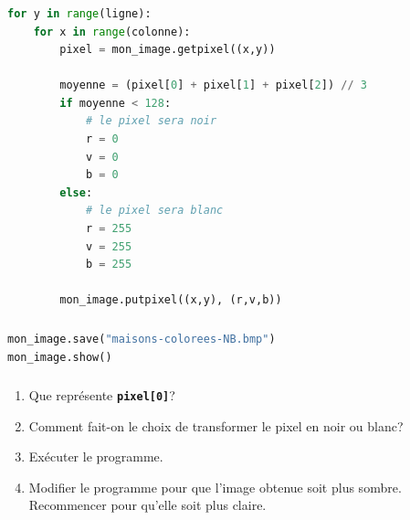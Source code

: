 \documentclass[svgnames,11pt]{beamer}
\begin{document}
\begin{frame}[fragile]
    \frametitle{}

    \begin{center}
        \begin{lstlisting}[language=Python , basicstyle=\ttfamily\small, xleftmargin=1em, xrightmargin=1em]
for y in range(ligne):
    for x in range(colonne):
        pixel = mon_image.getpixel((x,y))

        moyenne = (pixel[0] + pixel[1] + pixel[2]) // 3
        if moyenne < 128:
            # le pixel sera noir
            r = 0
            v = 0
            b = 0
        else:
            # le pixel sera blanc
            r = 255
            v = 255
            b = 255

        mon_image.putpixel((x,y), (r,v,b))
\end{lstlisting}
        \label{CODE}
    \end{center}

\end{frame}
\begin{frame}[fragile]
    \frametitle{}

    \begin{center}
        \begin{lstlisting}[language=Python , basicstyle=\ttfamily\small, xleftmargin=1em, xrightmargin=1em]
mon_image.save("maisons-colorees-NB.bmp")
mon_image.show()
\end{lstlisting}
        \label{CODE}
    \end{center}

\end{frame}
\begin{frame}
    \frametitle{}

    \begin{activite}
        \begin{enumerate}
            \item Que représente \textbf{\texttt{pixel[0]}}?
            \item Comment fait-on le choix de transformer le pixel en noir ou blanc?
            \item Exécuter le programme.
            \item Modifier le programme pour que l'image obtenue soit plus sombre. Recommencer pour qu'elle soit plus claire.
        \end{enumerate}
    \end{activite}

\end{frame}
\end{document}
